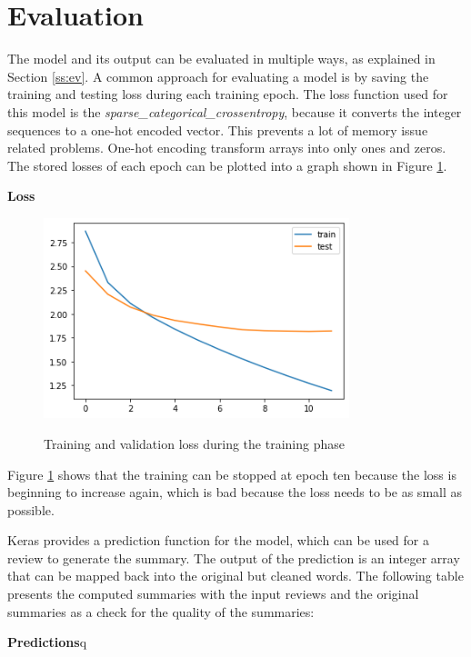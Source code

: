 \section{Evaluation}\label{ss:eval}

The model and its output can be evaluated in multiple ways, as explained in Section \ref{ss:ev}. A common approach for evaluating a model is by saving the training and testing loss during each training epoch. The loss function used for this model is the \textit{sparse\_categorical\_crossentropy}, because it converts the integer sequences to a one-hot encoded vector. This prevents a lot of memory issue related problems. One-hot encoding transform arrays into only ones and zeros. The stored losses of each epoch can be plotted into a graph shown in Figure \ref{eval}.

\textbf{Loss}

\begin{figure}
	\begin{center}
		\includegraphics[width=3.5in]{photos/eval}\\
		\caption{Training and validation loss during the training phase}\label{eval}
	\end{center}
\end{figure}

Figure \ref{eval} shows that the training can be stopped at epoch ten because the loss is beginning to increase again, which is bad because the loss needs to be as small as possible. 

Keras provides a prediction function for the model, which can be used for a review to generate the summary. The output of the prediction is an integer array that can be mapped back into the original but cleaned words. The following table presents the computed summaries with the input reviews and the original summaries as a check for the quality of the summaries:

\textbf{Predictions}q


